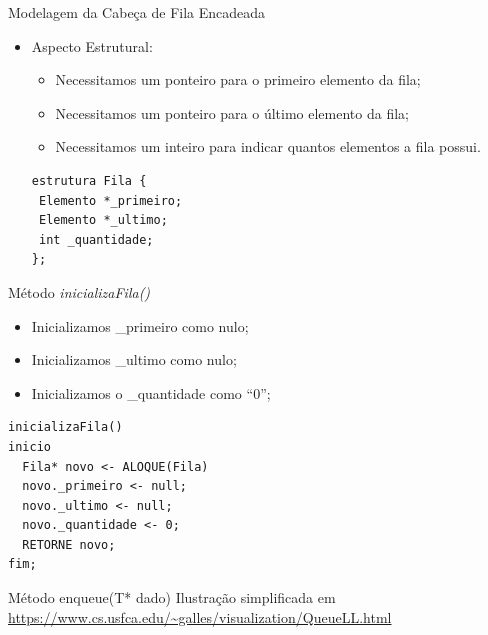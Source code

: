 \documentclass[12pt,table,xcolor={dvipsnames}]{beamer}
\begin{document}
\begin{frame}[fragile]{Modelagem da Cabeça de Fila Encadeada}

\begin{itemize}
\item Aspecto Estrutural:
\begin{itemize}
\item Necessitamos um ponteiro para o primeiro elemento da fila;
\item Necessitamos um ponteiro para o último elemento da fila;
\item Necessitamos um inteiro para indicar quantos elementos a fila possui.
\end{itemize}
\begin{lstlisting}
estrutura Fila {
 Elemento *_primeiro;
 Elemento *_ultimo;
 int _quantidade;
};
\end{lstlisting}
\end{itemize}
\end{frame}

\begin{frame}[fragile]{Método \textit{inicializaFila()}}

\begin{itemize}
\item Inicializamos  \_primeiro como nulo;
\item Inicializamos  \_ultimo como nulo;
\item Inicializamos o \_quantidade como ``0'';
\end{itemize}
\begin{lstlisting}
inicializaFila()
inicio
  Fila* novo <- ALOQUE(Fila)
  novo._primeiro <- null;
  novo._ultimo <- null;
  novo._quantidade <- 0;
  RETORNE novo;
fim;
\end{lstlisting}
\end{frame}

\begin{frame}{Método enqueue(T* dado)}
Ilustração simplificada em \\ 
\center\url{https://www.cs.usfca.edu/~galles/visualization/QueueLL.html}
\end{frame}
\end{document}

